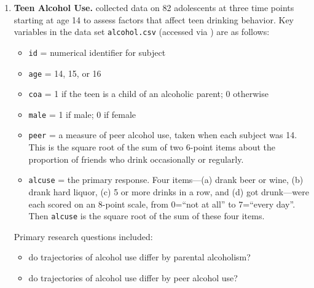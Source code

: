 \documentclass[
]{krantz}
\providecommand{\tightlist}{%
  \setlength{\itemsep}{0pt}\setlength{\parskip}{0pt}}
\begin{document}
\begin{enumerate}
\def\labelenumi{\arabic{enumi}.}
\tightlist
\item
  \textbf{Teen Alcohol Use.} \citet{Curran1997} collected data on 82 adolescents at three time points starting at age 14 to assess factors that affect teen drinking behavior. Key variables in the data set \texttt{alcohol.csv} (accessed via \citet{Singer2003}) are as follows:

  \begin{itemize}
  \tightlist
  \item
    \texttt{id} = numerical identifier for subject
  \item
    \texttt{age} = 14, 15, or 16
  \item
    \texttt{coa} = 1 if the teen is a child of an alcoholic parent; 0 otherwise
  \item
    \texttt{male} = 1 if male; 0 if female
  \item
    \texttt{peer} = a measure of peer alcohol use, taken when each subject was 14. This is the square root of the
    sum of two 6-point items about the proportion of friends who drink occasionally or regularly.
  \item
    \texttt{alcuse} = the primary response. Four items---(a) drank beer or wine, (b) drank hard liquor, (c) 5 or
    more drinks in a row, and (d) got drunk---were each scored on an 8-point scale, from 0=``not at all'' to
    7=``every day''. Then \texttt{alcuse} is the square root of the sum of these four items.
  \end{itemize}

  Primary research questions included:

  \begin{itemize}
  \tightlist
  \item
    do trajectories of alcohol use differ by parental alcoholism?
  \item
    do trajectories of alcohol use differ by peer alcohol use?
  \end{itemize}


\end{enumerate}
\end{document}
